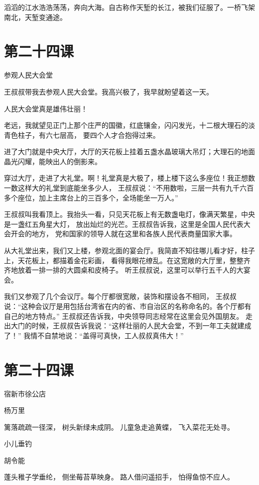 \documentclass[12pt,UTF8]{ctexbook}
\begin{document}
滔滔的江水浩浩荡荡，奔向大海。自古称作天堑的长江，被我们征服了。一桥飞架南北，天堑变通途。

\section{第二十四课}

参观人民大会堂

王叔叔带我去参观人民大会堂。我高兴极了，我早就盼望着这一天。

人民大会堂真是雄伟壮丽！

老远，我就望见正门上那个庄严的国徽，红底镶金，闪闪发光，十二根大理石的淡青色柱子，有六七层高，
要四个人才合抱得过来。

进了大门就是中央大厅，大厅的天花板上挂着五盏水晶玻璃大吊灯；大理石的地面晶光闪耀，能映出人的倒影来。

穿过大厅，走进了大礼堂。啊！礼堂真是大极了，楼上楼下这么多座位！我正想数一数这样大的礼堂到底能坐多少人，
王叔叔说：“不用数啦，三层一共有九千六百多个座位，加上主席台上的三百多个，全场能坐一万人。”

王叔叔叫我看顶上。我抬头一看，只见天花板上有无数盏电灯，像满天繁星，中央是一盏红五角星大灯，
放出灿烂的光芒。王叔叔告诉我，这里是全国人民代表大会开会的地方，
党和国家的领导人就在这里和各族人民代表商量国家大事。

从大礼堂出来，我们又上楼，参观北面的宴会厅。我简直不知往哪儿看才好，柱子上，天花板上，都描着金花彩画，
看得我眼花缭乱。在这宽敞的大厅里，整整齐齐地放着一排一排的大圆桌和皮椅子。
听王叔叔说，这里可以举行五千人的大宴会。

我们又参观了几个会议厅。每个厅都很宽敞，装饰和摆设各不相同，
王叔叔说：“这种会议厅是用包括台湾省在内的省、市自治区的名称命名的。各个厅都有自己的地方特点。”
王叔叔还告诉我，中央领导同志经常在这里会见外国朋友。
走出大门的时候，王叔叔告诉我说：“这样壮丽的人民大会堂，不到一年工夫就建成了！”
我情不自禁地说：“盖得可真快，工人叔叔真伟大！”

\section{第二十四课}

宿新市徐公店

杨万里

篱落疏疏一径深，
树头新绿未成阴。
儿童急走追黄蝶，
飞入菜花无处寻。

小儿垂钓

胡令能

蓬头稚子学垂纶，
侧坐莓苔草映身。
路人借问遥招手，
怕得鱼惊不应人。
\end{document}
